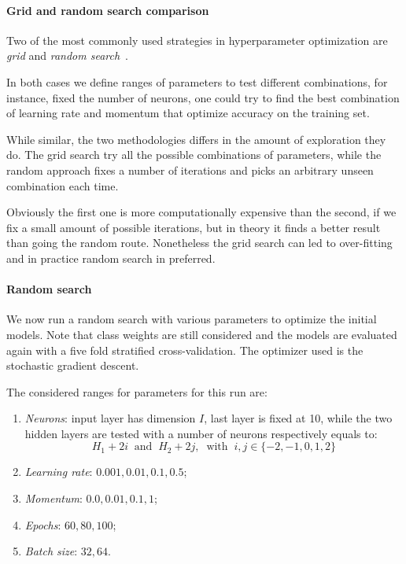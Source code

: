 \paragraph{Grid and random search comparison}
Two of the most commonly used strategies in hyperparameter optimization
are \emph{grid} and \emph{random search}~\cite{random-grid}. 

In both cases we define ranges of parameters to test different combinations, 
for instance, fixed the number of neurons, one could try to find the best 
combination of learning rate and momentum that optimize accuracy on the training set.

While similar, the two methodologies differs in the amount of exploration they do.
The grid search try all the possible combinations of parameters, while the 
random approach fixes a number of iterations and picks an arbitrary unseen 
combination each time. 

Obviously the first one is more computationally expensive than the second, if 
we fix a small amount of possible iterations, but in theory it finds a better result
than going the random route. 
Nonetheless the grid search can led to over-fitting and in practice random 
search in preferred.

\paragraph{Random search}
We now run a random search with various parameters 
to optimize the initial models.
Note that class weights are still considered and the models are evaluated
again with a five fold stratified cross-validation.
The optimizer used is the stochastic gradient descent.

The considered ranges for parameters for this run are: 
\begin{enumerate}
    \item \emph{Neurons}: input layer has dimension $I$, last layer is fixed at 10, while 
    the two hidden layers are tested with a number of neurons respectively 
    equals to: 
    $$H_1 + 2i\;\;\text{and}\;\;H_2 + 2j,\;\;\text{with}\;\; i, j \in \{-2,-1,0,1,2\}$$
    \item \emph{Learning rate}: $0.001, 0.01, 0.1, 0.5$;
    \item \emph{Momentum}: $0.0, 0.01, 0.1, 1$;
    \item \emph{Epochs}: $60, 80, 100$;
    \item \emph{Batch size}: $32, 64$.
\end{enumerate}


